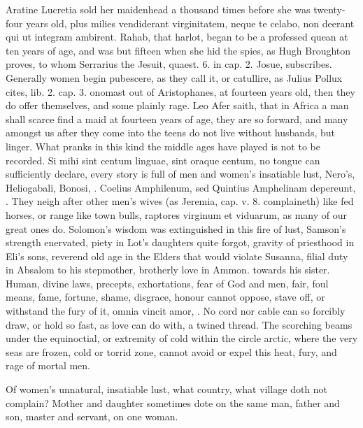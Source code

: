 {Aratine Lucretia sold her maidenhead a thousand times before she
was twenty-four years old, plus milies vendiderant virginitatem, \etc{}
neque te celabo, non deerant qui ut integram ambirent. Rahab, that
harlot, began to be a professed quean at ten years of age, and was but
fifteen when she hid the spies, as Hugh Broughton proves, to whom
Serrarius the Jesuit, quaest. 6. in cap. 2. Josue, subscribes.
Generally women begin pubescere, as they call it, or catullire, as
Julius Pollux cites, lib. 2. cap. 3. onomast out of Aristophanes,
at fourteen years old, then they do offer themselves, and some
plainly rage. Leo Afer saith, that in Africa a man shall scarce
find a maid at fourteen years of age, they are so forward, and many
amongst us after they come into the teens do not live without husbands,
but linger. What pranks in this kind the middle ages have played is not
to be recorded. Si mihi sint centum linguae, sint oraque centum, no
tongue can sufficiently declare, every story is full of men and women's
insatiable lust, Nero's, Heliogabali, Bonosi, \etc{}.  Coelius
Amphilenum, sed Quintius Amphelinam depereunt, \etc{}. They neigh after
other men's wives (as Jeremia, cap. v. 8. complaineth) like fed horses,
or range like town bulls, raptores virginum et viduarum, as many of our
great ones do. Solomon's wisdom was extinguished in this fire of lust,
Samson's strength enervated, piety in Lot's daughters quite forgot,
gravity of priesthood in Eli's sons, reverend old age in the Elders
that would violate Susanna, filial duty in Absalom to his stepmother,
brotherly love in Ammon. towards his sister. Human, divine laws,
precepts, exhortations, fear of God and men, fair, foul means, fame,
fortune, shame, disgrace, honour cannot oppose, stave off, or withstand
the fury of it, omnia vincit amor, \etc{}. No cord nor cable can so
forcibly draw, or hold so fast, as love can do with, a twined thread.
The scorching beams under the equinoctial, or extremity of cold within
the circle arctic, where the very seas are frozen, cold or torrid zone,
cannot avoid or expel this heat, fury, and rage of mortal men.

Of women's unnatural, insatiable lust, what country, what village
doth not complain? Mother and daughter sometimes dote on the same man,
father and son, master and servant, on one woman.

}
